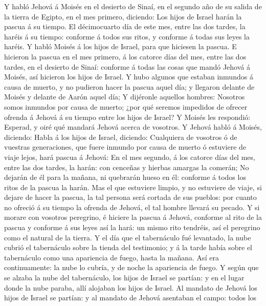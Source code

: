  Y habló Jehová á Moisés en el desierto de Sinaí, en el
segundo año de su salida de la tierra de Egipto, en el mes primero,
diciendo:  Los hijos de Israel harán la pascua á su tiempo.
 El décimocuarto día de este mes, entre las dos tardes, la
haréis á su tiempo: conforme á todos sus ritos, y conforme á todas sus
leyes la haréis.  Y habló Moisés á los hijos de Israel, para
que hiciesen la pascua.  E hicieron la pascua en el mes
primero, á los catorce días del mes, entre las dos tardes, en el
desierto de Sinaí: conforme á todas las cosas que mandó Jehová á Moisés,
así hicieron los hijos de Israel.  Y hubo algunos que
estaban inmundos á causa de muerto, y no pudieron hacer la pascua aquel
día; y llegaron delante de Moisés y delante de Aarón aquel día;
 Y dijéronle aquellos hombres: Nosotros somos inmundos por
causa de muerto; ¿por qué seremos impedidos de ofrecer ofrenda á Jehová
á su tiempo entre los hijos de Israel?  Y Moisés les
respondió: Esperad, y oiré qué mandará Jehová acerca de vosotros.
 Y Jehová habló á Moisés, diciendo:  Habla á
los hijos de Israel, diciendo: Cualquiera de vosotros ó de vuestras
generaciones, que fuere inmundo por causa de muerto ó estuviere de viaje
lejos, hará pascua á Jehová:  En el mes segundo, á los
catorce días del mes, entre las dos tardes, la harán: con cenceñas y
hierbas amargas la comerán;  No dejarán de él para la
mañana, ni quebrarán hueso en él: conforme á todos los ritos de la
pascua la harán.  Mas el que estuviere limpio, y no
estuviere de viaje, si dejare de hacer la pascua, la tal persona será
cortada de sus pueblos: por cuanto no ofreció á su tiempo la ofrenda de
Jehová, el tal hombre llevará su pecado.  Y si morare con
vosotros peregrino, é hiciere la pascua á Jehová, conforme al rito de la
pascua y conforme á sus leyes así la hará: un mismo rito tendréis, así
el peregrino como el natural de la tierra.  Y el día que el
tabernáculo fué levantado, la nube cubrió el tabernáculo sobre la tienda
del testimonio; y á la tarde había sobre el tabernáculo como una
apariencia de fuego, hasta la mañana.  Así era
continuamente: la nube lo cubría, y de noche la apariencia de fuego.
 Y según que se alzaba la nube del tabernáculo, los hijos
de Israel se partían: y en el lugar donde la nube paraba, allí alojaban
los hijos de Israel.  Al mandato de Jehová los hijos de
Israel se partían: y al mandato de Jehová asentaban el campo: todos los
